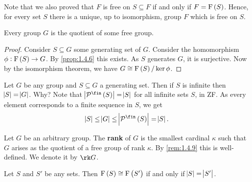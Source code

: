 
\begin{remark}
Note that we also proved that $ F $ is free on $ S \subseteq F $ if and only if $ F = \F\br{S} $. Hence, for every set $ S $ there is a unique, up to isomorphism, group $ F $ which is free on $ S $.
\end{remark}

\begin{lemma}
Every group $ G $ is the quotient of some free group.
\end{lemma}

\begin{proof}
Consider $ S \subseteq G $ some generating set of $ G $. Consider the homomorphism $ \phi : \F\br{S} \to G $. By \ref{prop:1.4.6} this exists. As $ S $ generates $ G $, it is surjective. Now by the isomorphism theorem, we have $ G \cong \F\br{S} / \ker \phi $.
\end{proof}

\begin{remark}
\label{rem:1.4.9}
Let $ G $ be any group and $ S \subseteq G $ a generating set. Then if $ S $ is infinite then $ \abs{S} = \abs{G} $. Why? Note that $ \abs{\PPP^{\fin}\br{S}} = \abs{S} $ for all infinite sets $ S $, in ZF. As every element corresponds to a finite sequence in $ S $, we get
$$ \abs{S} \le \abs{G} \le \abs{\PPP^{\fin}\br{S}} = \abs{S}. $$
\end{remark}

\begin{definition}
Let $ G $ be an arbitrary group. The \textbf{rank} of $ G $ is the smallest cardinal $ \kappa $ such that $ G $ arises as the quotient of a free group of rank $ \kappa $. By \ref{rem:1.4.9} this is well-defined. We denote it by $ \rk G $.
\end{definition}

\begin{lemma}
Let $ S $ and $ S' $ be any sets. Then $ \F\br{S} \cong \F\br{S'} $ if and only if $ \abs{S} = \abs{S'} $.
\end{lemma}

